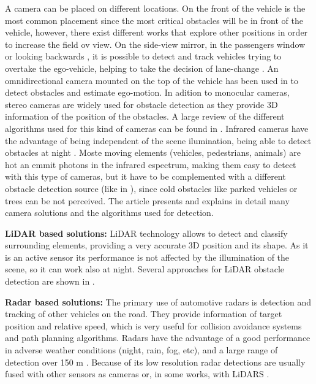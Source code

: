 A camera can be placed on different locations. On the front of the vehicle is 
the most common placement since the most critical obstacles will be in front of 
the vehicle, however, there exist different works that explore other positions 
in order to increase the field ov view. On the side-view mirror, in the 
passengers window \cite{chang2008real} or looking backwards \cite{liu2007rear}, 
it is possible to detect and track vehicles trying to overtake the ego-vehicle, 
helping to take the decision of lane-change \cite{alonso2008lane, 
song2007lateral, blanc2007larasidecam}. An omnidirectional camera mounted
on the top of the vehicle has been used in \cite{gandhi2006vehicle}
to detect obstacles and estimate ego-motion.
In adition to monocular cameras, stereo cameras are widely used for obstacle 
detection as they provide 3D information of the position of the obstacles. A 
large review of the different algorithms used for this kind of cameras can be 
found in \cite{bernini2014real}.
Infrared cameras have the advantage of being independent of the scene 
ilumination, being able to detect obstacles at night 
\cite{olmeda2013pedestrian}. Moste moving elements (vehicles, 
pedestrians, animals) are hot an emmit photons in the infrared espectrum, 
making them easy to detect with this type of cameras, but it have to be 
complemented with a different obstacle detection source (like in 
\cite{krotosky2007color}), since cold obstacles like parked vehicles or trees 
can be not perceived.
The article \cite{sivaraman2013looking} presents and explains in detail many
camera solutions and the algorithms used for detection.

\textbf{LiDAR based solutions:}
LiDAR technology allows to detect and classify surrounding elements, providing
a very accurate 3D position and its shape. 
As it is an active sensor its performance is not affected by the illumination 
of the scene, so it can work also at night. Several approaches for LiDAR 
obstacle detection are shown in \cite{li2016vehicle}.

\textbf{Radar based solutions:}
The primary use of automotive radars is detection and tracking of other 
vehicles on the road. They provide information of target position and relative 
speed, which is very useful for collision avoidance systems and path planning
algorithms. 
Radars have the advantage of a good performance in adverse weather conditions 
(night, rain, fog, etc), and a large range of detection over 150 m
\cite{blanc2004obstacle}. Because of its low resolution radar detections are
usually fused with other sensors as cameras \cite{garcia2012data} or, in some
works, with LiDARS \cite{gohring2011radar}.

